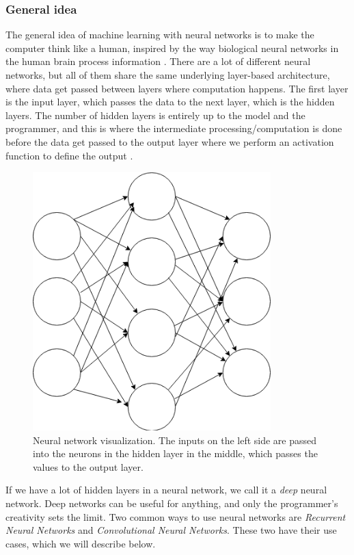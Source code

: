 \subsubsection{General idea}
The general idea of machine learning with neural networks is to make the computer think like a human, inspired by the way biological neural networks in the human 
brain process information \cite{neural_networks_0}. There are a lot of different neural networks, but all of them share the same underlying layer-based architecture, 
where data get passed between layers where computation happens. The first layer is the input layer, which passes the data to the next layer, which is the hidden layers. 
The number of hidden layers is entirely up to the model and the programmer, and this is where the intermediate processing/computation is done before the data get passed 
to the output layer where we perform an activation function to define the output \cite{neural_networks_1}.

\begin{figure}[h]
    \begin{center}
        \includegraphics[height=10cm]{neural_net.png}
        \caption{Neural network visualization. The inputs on the left side are passed into the neurons in the hidden layer in the middle, which passes the values to the output layer.}
        \label{figure:neural_net}
    \end{center}
\end{figure}

If we have a lot of hidden layers in a neural network, we call it a \textit{deep} neural network. Deep networks can be useful for anything, and only the programmer's creativity sets the limit. Two common ways to use neural networks are \textit{Recurrent Neural Networks} and \textit{Convolutional Neural Networks}. These two have their use cases, which we will describe below.

